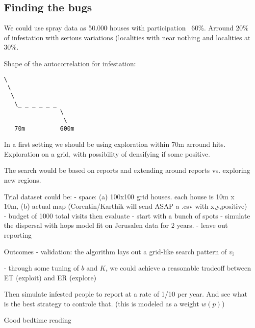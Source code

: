 \documentclass{article}
\begin{document}
\subsection{Finding the bugs}
We could use spray data as 50.000 houses with participation ~60\%. Arround 20\% of infestation with serious variations (localities with near nothing and localities at 30\%. 

Shape of the autocorrelation for infestation:
\begin{verbatim}
\
 \
  \
   \_ _ _ _ _ _ 
                \ 
                 \
   70m          600m 
\end{verbatim}

In a first setting we should be using exploration within 70m arround hits.
Exploration on a grid, with possibility of densifying if some positive.

The search would be based on reports and extending around reports vs. exploring new regions. 

Trial dataset could be:
- space: (a) 100x100 grid houses.  each house is 10m x 10m, (b) actual map
(Corentin/Karthik will send ASAP a .csv with x,y,positive)
- budget of 1000 total visits then evaluate
- start with a bunch of spots
- simulate the dispersal with hops model fit on Jerusalen data for 2 years. 
- leave out reporting

Outcomes
- validation: the algorithm lays out a grid-like search pattern of $v_i$

- through some tuning of $b$ and $K$, we could achieve a reasonable tradeoff between ET (exploit) and ER (explore)  

Then simulate infested people to report at a rate of 1/10 per year. And see what is the best strategy to controle that. 
(this is modeled as a weight $w(p)$)

Good bedtime reading\cite{adams1995hitchhiker}



\end{document}
